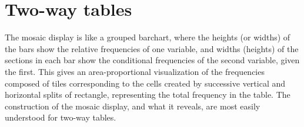 \documentclass[10pt,krantz2]{krantz}\usepackage[]{graphicx}\usepackage[]{color}
\begin{document}
\section{Two-way tables}\label{sec:mosaic-twoway}

The mosaic display
\citep{Friendly:92b,Friendly:94a,Friendly:97,HartiganKleiner:81,HartiganKleiner:84}
is like a grouped barchart,
where the heights (or widths) of the bars show the relative frequencies of one
variable, and widths (heights) of the sections in each bar show the
conditional frequencies of the second variable, given the first.
This gives an area-proportional visualization of the frequencies
composed of tiles corresponding to the cells created by successive
vertical and horizontal splits of rectangle, representing the total
frequency in the table.
The construction of the mosaic display, and what it reveals,
are most easily understood for two-way tables.
\end{document}

